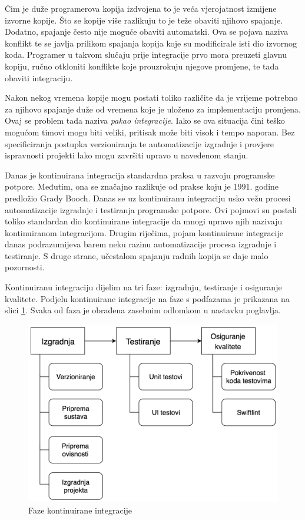 \documentclass[times, utf8, diplomski, numeric]{fer}
\begin{document}
Čim je duže programerova kopija izdvojena to je veća vjerojatnost izmijene izvorne kopije. Što se kopije više razlikuju to je teže obaviti njihovo spajanje. Dodatno, spajanje često nije moguće obaviti automatski. Ova se pojava naziva konflikt te se javlja prilikom spajanja kopija koje su modificirale isti dio izvornog koda. Programer u takvom slučaju prije integracije prvo mora preuzeti glavnu kopiju, ručno otkloniti konflikte koje prouzrokuju njegove promjene, te tada obaviti integraciju.

Nakon nekog vremena kopije mogu postati toliko različite da je vrijeme potrebno za njihovo spajanje duže od vremena koje je uloženo za implementaciju promjena. Ovaj se problem tada naziva \textit{pakao integracije}. Iako se ova situacija čini teško mogućom timovi mogu biti veliki, pritisak može biti visok i tempo naporan. Bez specificiranja postupka verzioniranja te automatizacije izgradnje i provjere ispravnosti projekti lako mogu završiti upravo u navedenom stanju.

Danas je kontinuirana integracija standardna praksa u razvoju programske potpore. Međutim, ona se značajno razlikuje od prakse koju je 1991. godine predložio Grady Booch. Danas se uz kontinuiranu integraciju usko vežu procesi automatizacije izgradnje i testiranja programske potpore. Ovi pojmovi su postali toliko standardan dio kontinuirane integracije da mnogi upravo njih nazivaju kontinuiranom integracijom. Drugim riječima, pojam kontinuirane integracije danas podrazumijeva barem neku razinu automatizacije procesa izgradnje i testiranje. S druge strane, učestalom spajanju radnih kopija se daje malo pozornosti.

Kontinuiranu integraciju dijelim na tri faze: izgradnju, testiranje i osiguranje kvalitete. Podjelu kontinuirane integracije na faze s podfazama je prikazana na slici \ref{fig:CIFazes}. Svaka od faza je obrađena zasebnim odlomkom u nastavku poglavlja.

\begin{figure}
\centering
\includegraphics[scale=0.6]{CIFazes}
\caption{Faze kontinuirane integracije}
\label{fig:CIFazes}
\end{figure}
\end{document}

